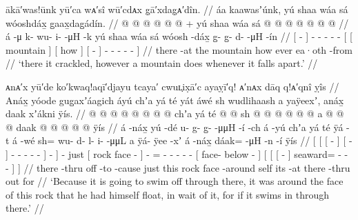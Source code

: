 \ex\label{ex:91-233-crackle-like-mountain-fall-apart}%
%
\begingl
	\glpreamble	ākā′was!ūnk yū′ca wᴀ′sî wū′cdᴀx g̣ā′xdag̣ᴀ′dîn. //
	\glpreamble	áa kaawasʼúnk, yú shaa wáa sá wóoshdáx̱ g̱aax̱dag̱ádín. //
	\gla	{}  @ {} {}
		 @ {} @ {} @ {} @ {} @ {} +
		{} {} yú shaa {} {} wáa sá {} {}  @ {} {}
			 @ {} @ {} @ {} @ {} @ {} @ {} {} //
	\glb	{} á -μ {}
		k- wu- i-  -μH -k
		{} {} yú shaa {} {} wáa sá {} {} wóosh -dáx̱ {}
			g̱- g̱- d-  -μH -ín {} //
	\glc	{}[  - {}]
		- - -  - -
		{}[ {}[  mountain {}] {}[ how  {}]
			{}[  - {}]
			- - -
				 - - {}] //
	\gld	{} there -at {}
		 {} {} {} {} {}
		{} {} the mountain {} {} how ever {} {} ea·oth -from {}
			 {} {} {} {} {} {} {} //
	\glft	‘there it crackled, however a mountain does whenever it falls apart.’
		//
\endgl
\xe

\ex\label{ex:91-234-float-around-rock-if-it-swims-out}%
%
\begingl
	\glpreamble	ᴀnᴀ′x yū′de ko′kwaq!aqī′djayu tcaya′ cwuʟ̣ix̣ā′c ayaỵī′q! ᴀ′nᴀx dāq q!ᴀ′qnî ỵîs //
	\glpreamble	Anáx̱ yóode gug̱axʼáagich áyú chʼa yá té yát áwé sh wudlihaash a yaÿeexʼ, anáx̱ daak xʼákni ÿís. //
	\gla	{} {} {}  @ {} {} {}  @ {} {}
			 @ {} @ {} @ {} @ {} @ {} {} {} {} 
		 @ {}
		chʼa {} yá té  @ {} {}  @ {}
		sh @  @ {} @ {} @ {} @ {} @ {}
		{} a  @ {} @ {} {}
		{} {} {}  @ {} {}
			daak @  @ {} @ {} @ {} @ {} {} ÿís {} //
	\glb	{} {} {} á -náx̱ {} {} yú -dé {}
			u- g- g̱-  -μμH -í {} -ch {}
		á -yú
		chʼa {} yá té ÿá -t {} á -wé
		sh= wu- d- l- i-  -μμL
		{} a ÿá- ÿee -xʼ {}
		{} {} {} á -náx̱ {}
			dáak= {}  -μH -n -í {} ÿís {} //
	\glc	{}[ {}[ {}[  - {}]
			{}[  - {}]
			- - -  - - {}]
			- {}]
		 -
		just {}[  rock face - {}]  -
		= - - - -  -
		{}[  face- below - {}]
		{}[ {}[ {}[  - {}]
			seaward= \· 
				- - - {}]  {}] //
	\gld	{} {} {} there -thru {} {} off -to {}
			 {} {} {} {} {} {} -cause {}
		 {}
		just {} this rock face -around {}  {}
		self  {} {} {} {} {}
		{} its  {} -at {}
		{} {} {} there -thru {}
			out  {} {} {} {} {} for {} //
	\glft	‘Because it is going to swim off through there, it was around the face of this rock that he had himself float, in wait of it, for if it swims in through there.’
		//
\endgl
\xe

